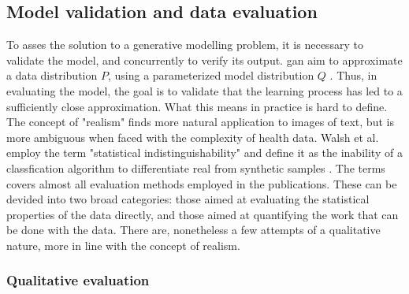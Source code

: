     \subsection{Model validation and data evaluation}

        To asses the solution to a generative modelling problem, it is necessary to validate the model, and concurrently to verify its output. \gls{gan} aim to approximate a data distribution $P$, using a parameterized model distribution $Q$ \cite{Borji2018-fy}. Thus, in evaluating the model, the goal is to validate that the learning process has led to a sufficiently close approximation. What this means in practice is hard to define. The concept of "realism" finds more natural application to images of text, but is more ambiguous when faced with the complexity of health data. Walsh et al. employ the term "statistical indistinguishability" and define it as the inability of a classfication algorithm to differentiate real from synthetic samples \cite{walsh2020generating}. The terms covers almost all evaluation methods employed in the publications. These can be devided into two broad categories: those aimed at evaluating the statistical properties of the data directly, and those aimed at quantifying the work that can be done with the data.  There are, nonetheless a few attempts of a qualitative nature, more in line with the concept of realism. 

        \subsubsection{Qualitative evaluation}

